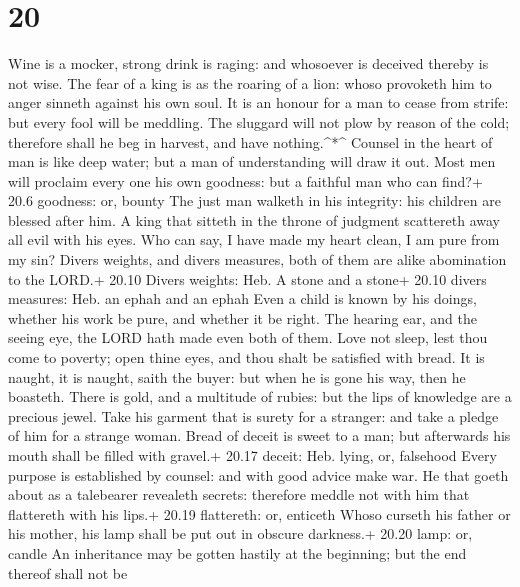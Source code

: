 \hypertarget{section-19}{%
\section{20}\label{section-19}}

 Wine is a mocker, strong drink is raging: and whosoever is
deceived thereby is not wise.  The fear of a king is as the
roaring of a lion: whoso provoketh him to anger sinneth against his own
soul.  It is an honour for a man to cease from strife: but
every fool will be meddling.  The sluggard will not plow by
reason of the cold; therefore shall he beg in harvest, and have
nothing.\^{}*\^{}  Counsel in the heart of man is like deep
water; but a man of understanding will draw it out.  Most
men will proclaim every one his own goodness: but a faithful man who can
find?+ 20.6 goodness: or, bounty  The just man walketh in
his integrity: his children are blessed after him.  A king
that sitteth in the throne of judgment scattereth away all evil with his
eyes.  Who can say, I have made my heart clean, I am pure
from my sin?  Divers weights, and divers measures, both of
them are alike abomination to the LORD.+ 20.10 Divers weights: Heb. A
stone and a stone+ 20.10 divers measures: Heb. an ephah and an ephah
 Even a child is known by his doings, whether his work be
pure, and whether it be right.  The hearing ear, and the
seeing eye, the LORD hath made even both of them.  Love not
sleep, lest thou come to poverty; open thine eyes, and thou shalt be
satisfied with bread.  It is naught, it is naught, saith
the buyer: but when he is gone his way, then he boasteth. 
There is gold, and a multitude of rubies: but the lips of knowledge are
a precious jewel.  Take his garment that is surety for a
stranger: and take a pledge of him for a strange woman. 
Bread of deceit is sweet to a man; but afterwards his mouth shall be
filled with gravel.+ 20.17 deceit: Heb. lying, or, falsehood
 Every purpose is established by counsel: and with good
advice make war.  He that goeth about as a talebearer
revealeth secrets: therefore meddle not with him that flattereth with
his lips.+ 20.19 flattereth: or, enticeth  Whoso curseth
his father or his mother, his lamp shall be put out in obscure
darkness.+ 20.20 lamp: or, candle  An inheritance may be
gotten hastily at the beginning; but the end thereof shall not be
